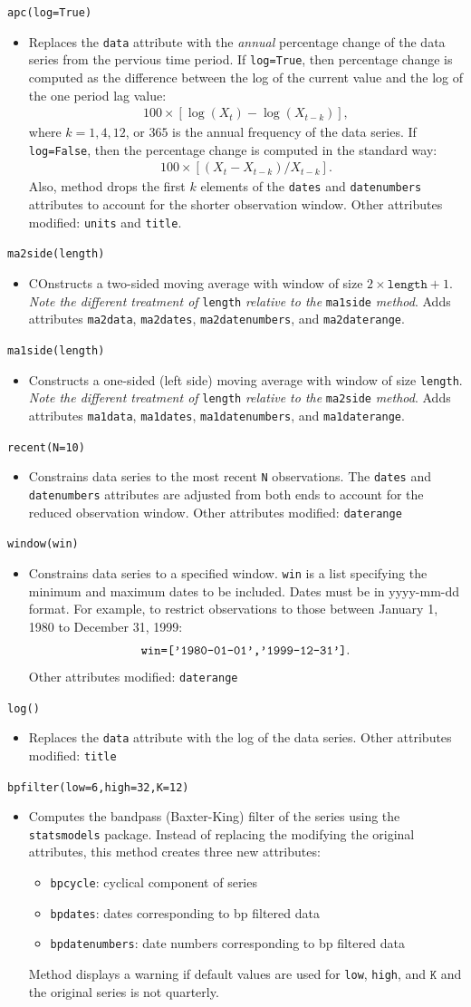 \documentclass[11pt,fleqn]{article}
\newcommand{\EE}{\begin{eqnarray}}
\newcommand{\FF}{\end{eqnarray}}
\newcommand{\IZ}{\begin{itemize}}
\newcommand{\ZI}{\end{itemize}}
\newcommand{\itemb}{\item[]}
\newcommand{\ttt}{\texttt}
\begin{document}
	\itemb \ttt{apc(log=True)}
		\IZ
		\itemb Replaces the \ttt{data} attribute with the \emph{annual} percentage change of the data series from the pervious time period. If \ttt{log=True}, then percentage change is computed as the difference between the log of the current value and the log of the one period lag value:
			\EE
			100 \times \left[\log(X_t) - \log(X_{t-k})\right],
			\FF
		where $k=1,4,12$, or $365$ is the annual frequency of the data series. If \ttt{log=False}, then the percentage change is computed in the standard way:
			\EE
			100 \times \left[(X_t - X_{t-k})/X_{t-k}\right].
			\FF
		Also, method drops the first $k$ elements of the \ttt{dates} and \ttt{datenumbers} attributes to account for the shorter observation window. Other attributes modified: \ttt{units} and \ttt{title}.
		\ZI
	
	\itemb \ttt{ma2side(length)}
		\IZ
		\itemb COnstructs a two-sided moving average with window of size $2\times\ttt{length}+1$. \emph{Note the different treatment of} \ttt{length} \emph{relative to the} \ttt{ma1side} \emph{method}. Adds attributes \ttt{ma2data}, \ttt{ma2dates}, \ttt{ma2datenumbers}, and \ttt{ma2daterange}.
		\ZI
		
	\itemb \ttt{ma1side(length)}
		\IZ
		\itemb Constructs a one-sided (left side) moving average with window of size \ttt{length}. \emph{Note the different treatment of} \ttt{length} \emph{relative to the} \ttt{ma2side} \emph{method}. Adds attributes \ttt{ma1data}, \ttt{ma1dates}, \ttt{ma1datenumbers}, and \ttt{ma1daterange}.
		\ZI
		
	\itemb \ttt{recent(N=10)}
		\IZ
		\itemb Constrains data series to the most recent \ttt{N} observations. The \ttt{dates} and \ttt{datenumbers} attributes are adjusted from both ends to account for the reduced observation window. Other attributes modified: \ttt{daterange}
		\ZI
		
	\itemb \ttt{window(win)}
		\IZ
		\itemb Constrains data series to a specified window. \ttt{win} is a list specifying the minimum and maximum dates to be included. Dates must be in yyyy-mm-dd format. For example, to restrict observations to those between January 1, 1980 to December 31, 1999:
			\EE
			\verb!win=['1980-01-01','1999-12-31']!.
			\FF
		Other attributes modified: \ttt{daterange}
		\ZI
		
	\itemb \ttt{log()}
		\IZ
		\itemb Replaces the \ttt{data} attribute with the log of the data series. Other attributes modified: \ttt{title}
		\ZI
		
	\itemb \ttt{bpfilter(low=6,high=32,K=12)}
		\IZ
		\itemb Computes the bandpass (Baxter-King) filter of the series using the \ttt{statsmodels} package. Instead of replacing the modifying the original attributes, this method creates three new attributes:
			\IZ
            \itemb \ttt{bpcycle}: cyclical component of series
            \itemb \ttt{bpdates}: dates corresponding to bp filtered data
            \itemb \ttt{bpdatenumbers}: date numbers corresponding to bp filtered data
            \ZI
       Method displays a warning if default values are used for \ttt{low}, \ttt{high}, and $\ttt{K}$ and the original series is not quarterly.
		\ZI
	
\end{document}
